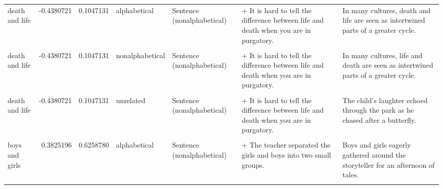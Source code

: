 \documentclass[
  12pt,
]{scrartcl}
\begin{document}
\begin{landscape}
\begin{longtable}{lrrllll}
death and life & -0.4380721 & 0.1047131 & alphabetical & Sentence (nonalphabetical) & + It is hard to tell the difference between life and death when you are in purgatory. & In many cultures, death and life are seen as intertwined parts of a greater cycle.\\
\cellcolor{gray!6}{death and life} & \cellcolor{gray!6}{-0.4380721} & \cellcolor{gray!6}{0.1047131} & \cellcolor{gray!6}{nonalphabetical} & \cellcolor{gray!6}{Sentence (alphabetical)} & \cellcolor{gray!6}{+ It is hard to tell the difference between death and life when you are in purgatory.} & \cellcolor{gray!6}{In many cultures, life and death are seen as intertwined parts of a greater cycle.}\\
death and life & -0.4380721 & 0.1047131 & nonalphabetical & Sentence (nonalphabetical) & + It is hard to tell the difference between life and death when you are in purgatory. & In many cultures, life and death are seen as intertwined parts of a greater cycle.\\
\addlinespace
\cellcolor{gray!6}{death and life} & \cellcolor{gray!6}{-0.4380721} & \cellcolor{gray!6}{0.1047131} & \cellcolor{gray!6}{unrelated} & \cellcolor{gray!6}{Sentence (alphabetical)} & \cellcolor{gray!6}{+ It is hard to tell the difference between death and life when you are in purgatory.} & \cellcolor{gray!6}{The child’s laughter echoed through the park as he chased after a butterfly.}\\
death and life & -0.4380721 & 0.1047131 & unrelated & Sentence (nonalphabetical) & + It is hard to tell the difference between life and death when you are in purgatory. & The child’s laughter echoed through the park as he chased after a butterfly.\\
\cellcolor{gray!6}{boys and girls} & \cellcolor{gray!6}{0.3825196} & \cellcolor{gray!6}{0.6258780} & \cellcolor{gray!6}{alphabetical} & \cellcolor{gray!6}{Sentence (alphabetical)} & \cellcolor{gray!6}{+ The teacher separated the boys and girls into two small groups.} & \cellcolor{gray!6}{Boys and girls eagerly gathered around the storyteller for an afternoon of tales.}\\
boys and girls & 0.3825196 & 0.6258780 & alphabetical & Sentence (nonalphabetical) & + The teacher separated the girls and boys into two small groups. & Boys and girls eagerly gathered around the storyteller for an afternoon of tales.\\
\cellcolor{gray!6}{boys and girls} & \cellcolor{gray!6}{0.3825196} & \cellcolor{gray!6}{0.6258780} & \cellcolor{gray!6}{nonalphabetical} & \cellcolor{gray!6}{Sentence (alphabetical)} & \cellcolor{gray!6}{+ The teacher separated the boys and girls into two small groups.} & \cellcolor{gray!6}{Girls and boys eagerly gathered around the storyteller for an afternoon of tales.}\\

\end{longtable}
\end{landscape}
\end{document}
